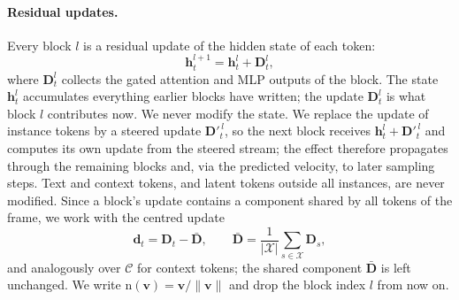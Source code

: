 \paragraph{Residual updates.}
Every block $l$ is a residual update of the hidden state of each token:
\begin{equation}
  \mathbf{h}^{l+1}_t = \mathbf{h}^{l}_t + \mathbf{D}^{l}_t ,
  \label{eq:residual}
\end{equation}
where $\mathbf{D}^{l}_t$ collects the gated attention and MLP outputs of the block. The state
$\mathbf{h}^{l}_t$ accumulates everything earlier blocks have written; the update $\mathbf{D}^{l}_t$ is what
block $l$ contributes now. We never modify the state. We replace the update of instance tokens by a steered
update $\mathbf{D}'^{\,l}_t$, so the next block receives $\mathbf{h}^{l}_t + \mathbf{D}'^{\,l}_t$ and computes
its own update from the steered stream; the effect therefore propagates through the remaining blocks and,
via the predicted velocity, to later sampling steps. Text and context tokens, and latent tokens outside all
instances, are never modified. Since a block's update contains a component shared by all tokens of the frame,
we work with the centred update
\begin{equation}
  \mathbf{d}_t = \mathbf{D}_t - \bar{\mathbf{D}},
  \qquad
  \bar{\mathbf{D}} = \frac{1}{|\mathcal{X}|}\sum_{s \in \mathcal{X}} \mathbf{D}_s ,
\end{equation}
and analogously over $\mathcal{C}$ for context tokens; the shared component $\bar{\mathbf{D}}$ is left
unchanged. We write $\mathrm{n}(\mathbf{v}) = \mathbf{v}/\lVert\mathbf{v}\rVert$ and drop the block index $l$
from now on.

